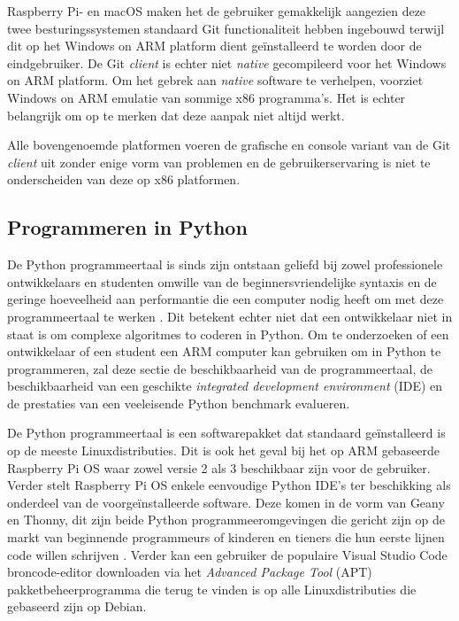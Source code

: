 Raspberry Pi- en macOS maken het de gebruiker gemakkelijk aangezien deze twee besturingssystemen standaard Git functionaliteit hebben ingebouwd terwijl dit op het Windows on ARM platform dient geïnstalleerd te worden door de eindgebruiker. De Git \textit{client} is echter niet \textit{native} gecompileerd voor het Windows on ARM platform. Om het gebrek aan \textit{native} software te verhelpen, voorziet Windows on ARM emulatie van sommige x86 programma’s. Het is echter belangrijk om op te merken dat deze aanpak niet altijd werkt. 

Alle bovengenoemde platformen voeren de grafische en console variant van de Git \textit{client} uit zonder enige vorm van problemen en de gebruikerservaring is niet te onderscheiden van deze op x86 platformen.

\subsection{Programmeren in Python}
De Python programmeertaal is sinds zijn ontstaan geliefd bij zowel professionele ontwikkelaars en studenten omwille van de beginnersvriendelijke syntaxis en de geringe hoeveelheid aan performantie die een computer nodig heeft om met deze programmeertaal te werken \autocite{StackOverflow2020}. Dit betekent echter niet dat een ontwikkelaar niet in staat is om complexe algoritmes to coderen in Python. Om te onderzoeken of een ontwikkelaar of een student een ARM computer kan gebruiken om in Python te programmeren, zal deze sectie de beschikbaarheid van de programmeertaal, de beschikbaarheid van een geschikte \textit{integrated development environment} (IDE) en de prestaties van een veeleisende Python benchmark evalueren.

De Python programmeertaal is een softwarepakket dat standaard geïnstalleerd is op de meeste Linuxdistributies. Dit is ook het geval bij het op ARM gebaseerde Raspberry Pi OS waar zowel versie 2 als 3 beschikbaar zijn voor de gebruiker. Verder stelt Raspberry Pi OS enkele eenvoudige Python IDE’s ter beschikking als onderdeel van de voorgeïnstalleerde software. Deze komen in de vorm van Geany en Thonny, dit zijn beide Python programmeeromgevingen die gericht zijn op de markt van beginnende programmeurs of kinderen en tieners die hun eerste lijnen code willen schrijven \autocite{Fromaget2021}. Verder kan een gebruiker de populaire Visual Studio Code broncode-editor downloaden via het \textit{Advanced Package Tool} (APT) pakketbeheerprogramma die terug te vinden is op alle Linuxdistributies die gebaseerd zijn op Debian.

